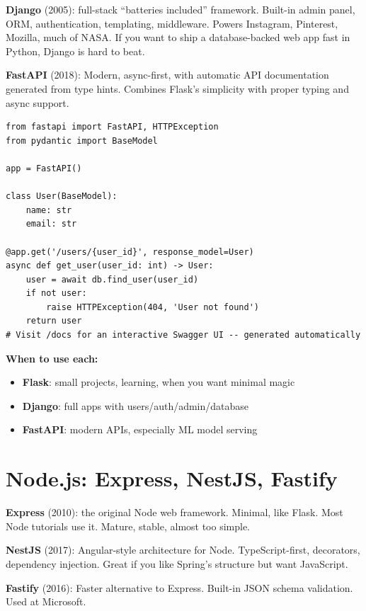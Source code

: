 \documentclass[11pt, letterpaper]{article}
\begin{document}
\textbf{Django} (2005): full-stack ``batteries included'' framework. Built-in admin panel, ORM, authentication, templating, middleware. Powers Instagram, Pinterest, Mozilla, much of NASA. If you want to ship a database-backed web app fast in Python, Django is hard to beat.

\textbf{FastAPI} (2018): Modern, async-first, with automatic API documentation generated from type hints. Combines Flask's simplicity with proper typing and async support.

\begin{lstlisting}[style=code, caption={FastAPI: typed, async, auto-documented}]
from fastapi import FastAPI, HTTPException
from pydantic import BaseModel

app = FastAPI()

class User(BaseModel):
    name: str
    email: str

@app.get('/users/{user_id}', response_model=User)
async def get_user(user_id: int) -> User:
    user = await db.find_user(user_id)
    if not user:
        raise HTTPException(404, 'User not found')
    return user
# Visit /docs for an interactive Swagger UI -- generated automatically
\end{lstlisting}

\textbf{When to use each:}
\begin{itemize}[noitemsep]
  \item \textbf{Flask}: small projects, learning, when you want minimal magic
  \item \textbf{Django}: full apps with users/auth/admin/database
  \item \textbf{FastAPI}: modern APIs, especially ML model serving
\end{itemize}

\section*{Node.js: Express, NestJS, Fastify}

\textbf{Express} (2010): the original Node web framework. Minimal, like Flask. Most Node tutorials use it. Mature, stable, almost too simple.

\textbf{NestJS} (2017): Angular-style architecture for Node. TypeScript-first, decorators, dependency injection. Great if you like Spring's structure but want JavaScript.

\textbf{Fastify} (2016): Faster alternative to Express. Built-in JSON schema validation. Used at Microsoft.
\end{document}
